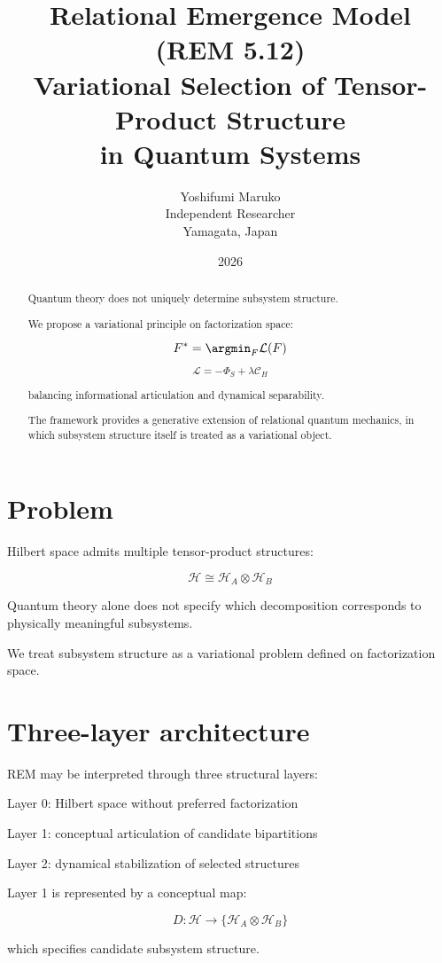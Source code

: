 \documentclass[11pt]{article}
\title{
Relational Emergence Model (REM 5.12)\\
Variational Selection of Tensor-Product Structure\\
in Quantum Systems
}
\author{
Yoshifumi Maruko\\
Independent Researcher\\
Yamagata, Japan
}
\date{2026}
\begin{document}
\maketitle

\begin{abstract}

Quantum theory does not uniquely determine subsystem structure.

We propose a variational principle on factorization space:

\[
F^* = \argmin_F \mathcal L(F)
\]

\[
\mathcal L = -\Phi_S + \lambda \mathcal C_H
\]

balancing informational articulation and dynamical separability.

The framework provides a generative extension of relational quantum mechanics,
in which subsystem structure itself is treated as a variational object.

\end{abstract}

\section{Problem}

Hilbert space admits multiple tensor-product structures:

\[
\mathcal H \cong \mathcal H_A \otimes \mathcal H_B
\]

Quantum theory alone does not specify which decomposition
corresponds to physically meaningful subsystems.

We treat subsystem structure as a variational problem
defined on factorization space.

\section{Three-layer architecture}

REM may be interpreted through three structural layers:

Layer 0:
Hilbert space without preferred factorization

Layer 1:
conceptual articulation of candidate bipartitions

Layer 2:
dynamical stabilization of selected structures

Layer 1 is represented by a conceptual map:

\[
D:
\mathcal H
\rightarrow
\{\mathcal H_A \otimes \mathcal H_B\}
\]

which specifies candidate subsystem structure.
\end{document}
